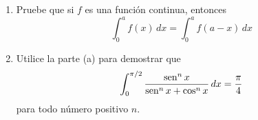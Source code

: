 \item 
    \begin{enumerate}
        \item[(a)] Pruebe que si $f$ es una función continua, entonces
        \[ \int_0^a f(x) \, dx = \int_0^a f(a - x) \, dx \]
        \item[(b)] Utilice la parte (a) para demostrar que
        \[ \int_0^{\pi/2} \frac{\operatorname{sen}^n x}{\operatorname{sen}^n x + \cos^n x} \, dx = \frac{\pi}{4} \]
        para todo número positivo $n$.
    \end{enumerate}
